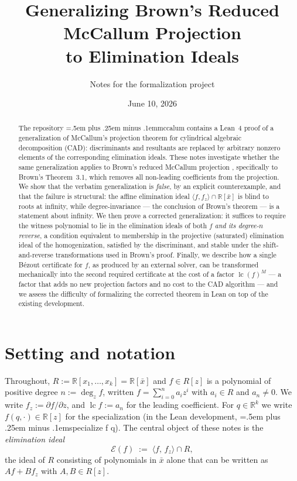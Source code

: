 \documentclass[11pt,a4paper]{article}
\title{Generalizing Brown's Reduced McCallum Projection\\ to Elimination Ideals}
\author{Notes for the \code{mccalum} formalization project}
\date{June 10, 2026}
\theoremstyle{definition}
\newcommand{\R}{\mathbb{R}}
\newcommand{\xb}{\bar{x}}
\newcommand{\lc}{\operatorname{lc}}
\newcommand{\E}{\mathcal{E}}
\newcommand{\ideal}[1]{\langle #1\rangle}
\newcommand{\code}[1]{{\ttfamily\spaceskip=.5em plus .25em minus .1em\relax #1}}
\begin{document}
\maketitle

\begin{abstract}
The repository \code{mccalum} contains a Lean~4 proof of a generalization of
McCallum's projection theorem for cylindrical algebraic decomposition (CAD):
discriminants and resultants are replaced by arbitrary nonzero elements of the
corresponding elimination ideals. These notes investigate whether the same
generalization applies to Brown's reduced McCallum projection
\cite{Brown01}, specifically to Brown's Theorem~3.1, which removes all
non-leading coefficients from the projection. We show that the verbatim
generalization is \emph{false}, by an explicit counterexample, and that the
failure is structural: the affine elimination ideal $\ideal{f,f_z}\cap\R[\xb]$
is blind to roots at infinity, while degree-invariance --- the conclusion of
Brown's theorem --- is a statement about infinity. We then prove a corrected
generalization: it suffices to require the witness polynomial to lie in the
elimination ideals of both $f$ \emph{and its degree-$n$ reverse}, a condition
equivalent to membership in the projective (saturated) elimination ideal of the
homogenization, satisfied by the discriminant, and stable under the
shift-and-reverse transformations used in Brown's proof. Finally, we describe
how a single B\'ezout certificate for $f$, as produced by an external solver,
can be transformed mechanically into the second required certificate at the
cost of a factor $\lc(f)^M$ --- a factor that adds no new projection factors and
no cost to the CAD algorithm --- and we assess the difficulty of formalizing the
corrected theorem in Lean on top of the existing development.
\end{abstract}

\section{Setting and notation}\label{sec:setting}

Throughout, $R := \R[x_1,\dots,x_k] = \R[\xb]$ and $f \in R[z]$ is a polynomial
of positive degree $n := \deg_z f$, written $f = \sum_{i=0}^{n} a_i z^i$ with
$a_i \in R$ and $a_n \neq 0$. We write $f_z := \partial f/\partial z$, and
$\lc f := a_n$ for the leading coefficient. For $q \in \R^k$ we write $f(q,\cdot)
\in \R[z]$ for the specialization (in the Lean development,
\code{specialize f q}). The central object of these notes is the
\emph{elimination ideal}
\[
  \E(f) \;:=\; \ideal{f,\, f_z} \cap R ,
\]
the ideal of $R$ consisting of polynomials in $\xb$ alone that can be written as
$A f + B f_z$ with $A, B \in R[z]$.
\end{document}
